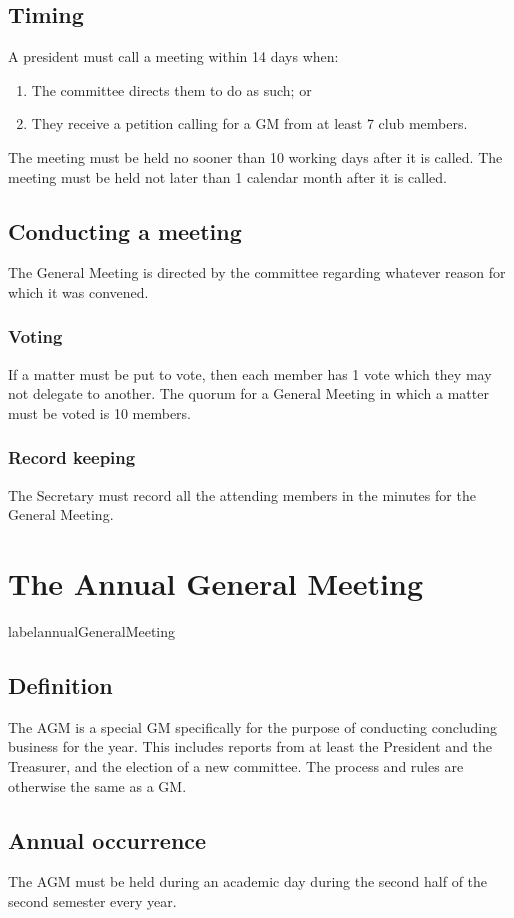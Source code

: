 \documentclass[11pt]{article}
\begin{document}
\subsection{Timing}
A president must call a meeting within 14 days when:
\begin{enumerate}
    \item The committee directs them to do as such; or
    \item They receive a petition calling for a GM from at least 7 club members.
\end{enumerate}
The meeting must be held no sooner than 10 working days after it is called.
The meeting must be held not later than 1 calendar month after it is called.
\subsection{Conducting a meeting}
The General Meeting is directed by the committee regarding whatever reason for which it was convened.
\subsubsection{Voting}
If a matter must be put to vote, then each member has 1 vote which they may not delegate to another. The quorum for a General Meeting in which a matter must be voted is 10 members.
\subsubsection{Record keeping}
The Secretary must record all the attending members in the minutes for the General Meeting.

\section{The Annual General Meeting} label{annualGeneralMeeting}
\subsection{Definition}
The AGM is a special GM specifically for the purpose of conducting concluding business for the year. This includes reports from at least the President and the Treasurer, and the election of a new committee. The process and rules are otherwise the same as a GM.
\subsection{Annual occurrence}
The AGM must be held during an academic day during the second half of the second semester every year.
\end{document}
